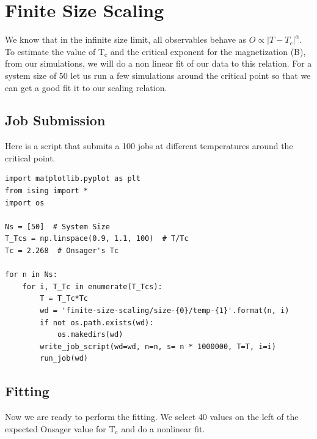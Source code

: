 \documentclass{article}
\begin{document}
\section{Finite Size Scaling}
\label{sec-6}

We know that in the infinite size limit, all observables behave as \( O \propto |T - T_{c}|^{\alpha}\). To estimate the value of T$_{\text{c}}$ and the critical exponent for the magnetization (B), from our simulations, we will do a non linear fit of our data to this relation. For a system size of 50 let us run a few simulations around the critical point so that we can get a good fit it to our scaling relation.

\subsection{Job Submission}
\label{sec-6-1}

Here is a script that submits a 100 jobs at different temperatures around the critical point.
\begin{verbatim}
import matplotlib.pyplot as plt
from ising import *
import os

Ns = [50]  # System Size
T_Tcs = np.linspace(0.9, 1.1, 100)  # T/Tc
Tc = 2.268  # Onsager's Tc

for n in Ns:
    for i, T_Tc in enumerate(T_Tcs):
        T = T_Tc*Tc
        wd = 'finite-size-scaling/size-{0}/temp-{1}'.format(n, i)
        if not os.path.exists(wd): 
            os.makedirs(wd)
        write_job_script(wd=wd, n=n, s= n * 1000000, T=T, i=i)
        run_job(wd)
\end{verbatim}

\subsection{Fitting}
\label{sec-6-2}

Now we are ready to perform the fitting. We select 40 values on the left of the expected Onsager value for T$_{\text{c}}$ and do a nonlinear fit.
\end{document}
